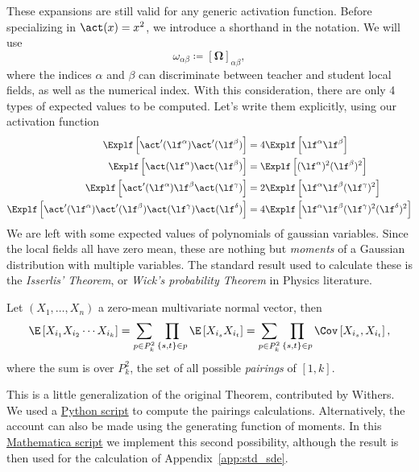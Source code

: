 These expansions are still valid for any generic activation function.
Before specializing in \(\act(x)=x^2\), we introduce a shorthand in the notation.
We will use \[\omega_{\alpha\beta} \coloneqq \left[\bm{\Omega}\right]_{\alpha\beta},\]
where the indices \(\alpha\) and \(\beta\) can discriminate between teacher and student local fields, as well as the numerical index.
With this consideration, there are only 4 types of expected values to be computed.
Let's write them explicitly, using our activation function
\[\begin{split}
  \Explf  \left[\act' (\lf^\alpha)  \act' (\lf^\beta)  \right] &= 
  4 \Explf  \left[\lf^\alpha \lf^\beta \right] \\
  \Explf  \left[\act(\lf^\alpha)  \act(\lf^\beta)  \right] &= 
  \Explf  \left[(\lf^\alpha)^2 (\lf^\beta)^2 \right] \\
  \Explf  \left[\act'(\lf^\alpha) \lf^\beta \act(\lf^\gamma) \right] &= 
  2\Explf  \left[\lf^\alpha \lf^\beta (\lf^\gamma)^2\right] \\
  \Explf  \left[\act'(\lf^\alpha) \act'(\lf^\beta) \act(\lf^\gamma) \act(\lf^\delta) \right] &= 
  4\Explf  \left[\lf^\alpha \lf^\beta (\lf^\gamma)^2 (\lf^\delta)^2\right] \\
\end{split}\]
We are left with some expected values of polynomials of gaussian variables. 
Since the local fields all have zero mean, these are nothing but \emph{moments} 
of a Gaussian distribution with multiple variables.
The standard result used to calculate these is the \emph{Isserlis' Theorem}, or 
\emph{Wick's probability Theorem} in Physics literature.
\begin{theorem}
  Let \((X_1,\dots,X_n)\) a zero-mean multivariate normal vector,
  then
  \[
    \E\left[X_{i_1}X_{i_2}\cdots X_{i_k}\right] =
      \sum_{p\in P^2_k}\prod_{\{s,t\}\in p} \E\left[X_{i_s}X_{i_t}\right] =
      \sum_{p\in P^2_k}\prod_{\{s,t\}\in p} \Cov\left[X_{i_s},X_{i_t}\right],
  \]
  where the sum is over \(P^2_k\), the set of all possible \emph{pairings} of \([1,k]\).
\end{theorem}
This is a little generalization of the original Theorem, contributed by Withers\cite{withers1985moments}.
We used a \href{https://github.com/arn4/master-thesis/blob/main/analytical-calculations%20/isserlis.py}{Python script} to compute the pairings calculations.
Alternatively, the account can also be made using the generating function of moments.
In this \href{https://github.com/arn4/master-thesis/blob/main/analytical-calculations%20/isserlis.nb}{Mathematica script} we implement this second possibility, 
although the result is then used for the calculation of Appendix~\ref{app:std_sde}.


